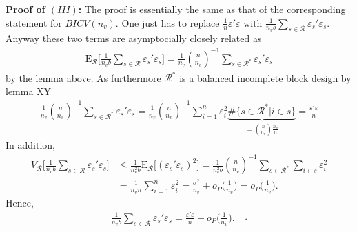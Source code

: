 \documentclass[Research_Module_ES.tex]{subfiles}
\begin{document}
\textbf{Proof of $(III)$:} 
The proof is essentially the same as that of the corresponding statement for $BICV(n_v)$. One just has to replace $\frac{1}{n}\varepsilon'\varepsilon$ with $\frac{1}{n_vb}\sum_{s\in \mathcal{R}}\varepsilon_s'\varepsilon_s$. Anyway these two terms are asymptocially closely related as
\begin{align*}
\mathrm{E}_\mathcal{R} \biggl[ \frac{1}{n_vb}\sum_{s\in \mathcal{R}}\varepsilon_s'\varepsilon_s\biggr] 
=\frac{1}{n_v}\binom{n}{n_v}^{-1}\sum_{s\in \mathcal{R}^\ast}\varepsilon_s'\varepsilon_s
\end{align*}
by the lemma above. As furthermore $\mathcal{R}^\ast$ is a balanced incomplete block design by lemma XY 
\begin{align*}
\frac{1}{n_v}\binom{n}{n_v}^{-1}\sum_{s\in \mathcal{R}^\ast}\varepsilon_s'\varepsilon_s
= \frac{1}{n_v}\binom{n}{n_v}^{-1}\sum_{i=1}^n \varepsilon_i^2 \underbrace{\#\{s\in \mathcal{R}^\ast | i\in s\}}_{=\binom{n}{n_v}\frac{n_v}{n}}
= \frac{\varepsilon'\varepsilon}{n}
\end{align*}
In addition,
\begin{align*}
V_\mathcal{R} \biggl[ \frac{1}{n_vb}\sum_{s\in \mathcal{R}}\varepsilon_s'\varepsilon_s\biggr]
&\le \frac{1}{n_v^2b}\mathrm{E}_\mathcal{R} \bigl[(\varepsilon_s'\varepsilon_s)^2\bigr]
= \frac{1}{n_v^2b}\binom{n}{n_v}^{-1}\sum_{s\in \mathcal{R}^\ast}\sum_{i\in s} \varepsilon_i^2\\
&= \frac{1}{n_vn} \sum_{i=1}^n \varepsilon_i^2 
= \frac{\sigma^2}{n_v} + o_P\biggl(\frac{1}{n_v}\biggr)
= o_P\biggl(\frac{1}{n_v}\biggr).
\end{align*}
Hence, 
\begin{align*}
\frac{1}{n_vb}\sum_{s\in \mathcal{R}}\varepsilon_s'\varepsilon_s =\frac{\varepsilon'\varepsilon}{n} +o_P\biggl(\frac{1}{n_v}\biggr). \quad \square
\end{align*}
\end{document}
